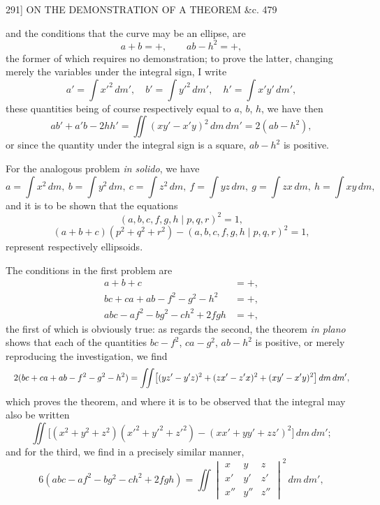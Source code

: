\documentclass[11pt]{article}
\begin{document}
\begin{center}
\textsc{291]} \hfill ON THE DEMONSTRATION OF A THEOREM \&c. \hfill 479
\end{center}

and the conditions that the curve may be an ellipse, are
\[ a+b=+,\qquad ab-h^{2}=+, \]
the former of which requires no demonstration; to prove the latter, changing merely
the variables under the integral sign, I write
\[ a'=\int x'^{2}\,dm',\quad b'=\int y'^{2}\,dm',\quad h'=\int x'y'\,dm', \]
these quantities being of course respectively equal to $a$, $b$, $h$, we have then
\[ ab'+a'b-2hh'=\iint(xy'-x'y)^{2}\,dm\,dm'=2(ab-h^{2}), \]
or since the quantity under the integral sign is a square, $ab-h^{2}$ is positive.

For the analogous problem \emph{in solido}, we have
\[ a=\int x^{2}\,dm,\ b=\int y^{2}\,dm,\ c=\int z^{2}\,dm,\ f=\int yz\,dm,\ g=\int zx\,dm,\ h=\int xy\,dm, \]
and it is to be shown that the equations
\[ (a,b,c,f,g,h \mid p,q,r)^{2}=1, \]
\[ (a+b+c)(p^{2}+q^{2}+r^{2})-(a,b,c,f,g,h \mid p,q,r)^{2}=1, \]
represent respectively ellipsoids.

The conditions in the first problem are
\[ \begin{aligned}
a+b+c &= +,\\
bc+ca+ab-f^{2}-g^{2}-h^{2} &= +,\\
abc-af^{2}-bg^{2}-ch^{2}+2fgh &= +,
\end{aligned} \]
the first of which is obviously true: as regards the second, the theorem \emph{in plano} shows
that each of the quantities $bc-f^{2}$, $ca-g^{2}$, $ab-h^{2}$ is positive, or merely reproducing
the investigation, we find
\[ \resizebox{\textwidth}{!}{$\displaystyle
2(bc+ca+ab-f^{2}-g^{2}-h^{2})=\iint\bigl[(yz'-y'z)^{2}+(zx'-z'x)^{2}+(xy'-x'y)^{2}\bigr]\,dm\,dm',$} \]
which proves the theorem, and where it is to be observed that the integral may also
be written
\[ \iint\bigl[(x^{2}+y^{2}+z^{2})(x'^{2}+y'^{2}+z'^{2})-(xx'+yy'+zz')^{2}\bigr]\,dm\,dm'; \]
and for the third, we find in a precisely similar manner,
\[ 6(abc-af^{2}-bg^{2}-ch^{2}+2fgh)=\iint
\begin{vmatrix} x & y & z \\ x' & y' & z' \\ x'' & y'' & z'' \end{vmatrix}^{2}\,dm\,dm', \]
\end{document}
